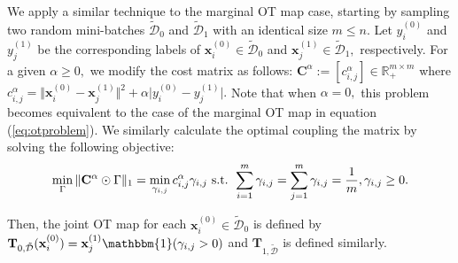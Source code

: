 \documentclass[10pt]{article} %
\begin{document}
We apply a similar technique to the marginal OT map case, starting by sampling two random mini-batches $\tilde{\mathcal{D}}_{0}$ and $\tilde{\mathcal{D}}_{1}$ with an identical size $m \le n.$
Let $y_{i}^{(0)}$ and $y_{j}^{(1)}$ be the corresponding labels of $\mathbf{x}_{i}^{(0)} \in \tilde{\mathcal{D}}_{0}$ and $\mathbf{x}_{j}^{(1)} \in \tilde{\mathcal{D}}_{1},$ respectively.
For a given $\alpha \ge 0,$ we modify the cost matrix as follows:
$\mathbf{C}^{\alpha} := [c_{i, j}^{\alpha}] \in \mathbb{R}_{+}^{m \times m}$ where $ c_{i, j}^{\alpha} = \Vert \mathbf{x}_{i}^{(0)} - \mathbf{x}_{j}^{(1)} \Vert^{2} + \alpha \vert y_{i}^{(0)} - y_{j}^{(1)} \vert.$
Note that when $\alpha = 0,$ this problem becomes equivalent to the case of the marginal OT map in equation (\ref{eq:otproblem}).
We similarly calculate the optimal coupling the matrix by solving the following objective:
\begin{equation}\label{eq:otXYproblem}
    \min_{\Gamma} \Vert \mathbf{C}^{\alpha} \odot \Gamma \Vert_{1}
    = \min_{\gamma_{i, j}} c_{i, j}^{\alpha} \gamma_{i, j}
    \textup{ s.t. }
    \sum_{i=1}^{m} \gamma_{i, j} = \sum_{j=1}^{m} \gamma_{i, j} = \frac{1}{m},
    \gamma_{i, j} \ge 0.
\end{equation}


Then, the joint OT map for each $\mathbf{x}_{i}^{(0)} \in \tilde{\mathcal{D}}_{0}$ is defined by $\mathbf{T}_{0, \tilde{\mathcal{D}}}(\mathbf{x}_{i}^{(0)}) = \mathbf{x}_{j}^{(1)} \mathbbm{1}(\gamma_{i, j} > 0)$ and $\mathbf{T}_{1, \tilde{\mathcal{D}}}$ is defined similarly.
\end{document}
